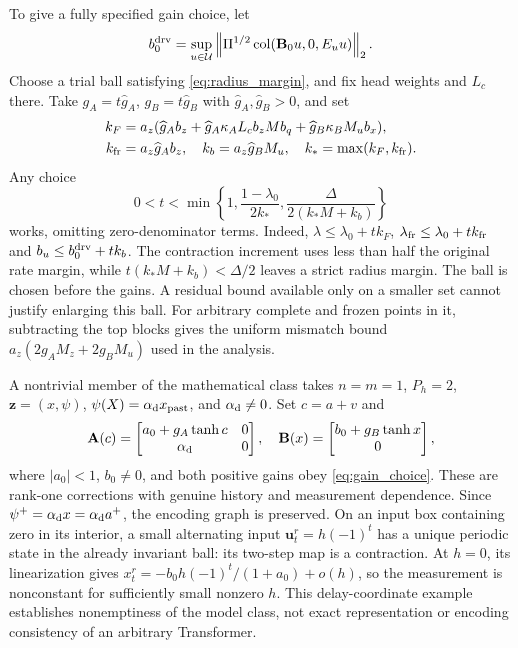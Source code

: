 \documentclass[journal]{IEEEtran}
\newcommand{\vu}{\mathbf{u}}
\newcommand{\vz}{\mathbf{z}}
\newcommand{\mA}{\mathbf{A}}
\newcommand{\mB}{\mathbf{B}}
\newcommand{\norm}[1]{\left\lVert #1\right\rVert}
\newcommand{\col}{\operatorname{col}}
\begin{document}
To give a fully specified gain choice, let
\begin{equation*}
b_0^{\rm drv}=\sup_{u\in\mathcal U}
\norm{\Pi^{1/2}\col(\mB_0u,0,E_uu)}_2.
\end{equation*}
Choose a trial ball satisfying \eqref{eq:radius_margin}, and fix head weights and $L_c$ there. Take $g_A=t\widehat g_A$, $g_B=t\widehat g_B$ with $\widehat g_A,\widehat g_B>0$, and set
\begin{equation}
\begin{split}
k_F&=a_z(\widehat g_A b_z+\widehat g_A\kappa_A L_c b_zMb_q
+\widehat g_B\kappa_BM_ub_x),\\
k_{\rm fr}&=a_z\widehat g_A b_z,\quad k_b=a_z\widehat g_BM_u,
\quad k_* =\max(k_F,k_{\rm fr}).
\end{split}
\label{eq:gain_coefficients}
\end{equation}
Any choice
\begin{equation}
0<t<\min\left\{1,\frac{1-\lambda_0}{2k_*},
\frac{\Delta}{2(k_*M+k_b)}\right\}
\label{eq:gain_choice}
\end{equation}
works, omitting zero-denominator terms. Indeed, $\lambda\le\lambda_0+tk_F$, $\lambda_{\rm fr}\le\lambda_0+tk_{\rm fr}$ and $b_u\le b_0^{\rm drv}+tk_b$. The contraction increment uses less than half the original rate margin, while $t(k_*M+k_b)<\Delta/2$ leaves a strict radius margin. The ball is chosen before the gains. A residual bound available only on a smaller set cannot justify enlarging this ball. For arbitrary complete and frozen points in it, subtracting the top blocks gives the uniform mismatch bound $a_z(2g_AM_z+2g_BM_u)$ used in the analysis.

A nontrivial member of the mathematical class takes $n=m=1$, $P_h=2$, $\vz=(x,\psi)$, $\psi(X)=\alpha_{\rm d} x_{\rm past}$, and $\alpha_{\rm d}\ne0$. Set $c=a+v$ and
\begin{equation}
\mA(c)=\begin{bmatrix}a_0+g_A\tanh c&0\\\alpha_{\rm d}&0\end{bmatrix},\quad
\mB(x)=\begin{bmatrix}b_0+g_B\tanh x\\0\end{bmatrix},
\label{eq:analytic_example}
\end{equation}
where $|a_0|<1$, $b_0\ne0$, and both positive gains obey \eqref{eq:gain_choice}. These are rank-one corrections with genuine history and measurement dependence. Since $\psi^+=\alpha_{\rm d}x=\alpha_{\rm d}a^+$, the encoding graph is preserved. On an input box containing zero in its interior, a small alternating input $\vu_t^r=h(-1)^t$ has a unique periodic state in the already invariant ball: its two-step map is a contraction. At $h=0$, its linearization gives $x_t^r=-b_0h(-1)^t/(1+a_0)+o(h)$, so the measurement is nonconstant for sufficiently small nonzero $h$. This delay-coordinate example establishes nonemptiness of the model class, not exact representation or encoding consistency of an arbitrary Transformer.
\end{document}
